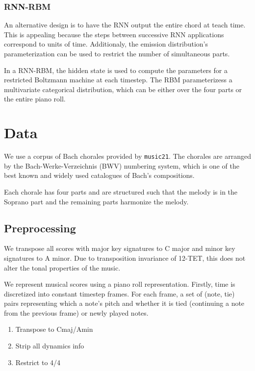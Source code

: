 \documentclass[a4paper,12pt,twoside,openright]{report}
\begin{document}
\subsection{RNN-RBM}
An alternative design is to have the RNN output the entire chord at teach time.
This is appealing because the steps between successive RNN applications
correspond to units of time. Additionaly, the emission distribution's parameterization
can be used to restrict the number of simultaneous parts.

In a RNN-RBM, the hidden state is used to compute the parameters for a restricted Boltzmann
machine at each timestep. The RBM parameterizess a multivariate categorical distribution,
which can be either over the four parts or the entire piano roll.

\chapter{Data}

We use a corpus of Bach chorales provided by \texttt{music21}. The chorales are
arranged by the Bach-Werke-Verzeichnis (BWV) numbering system, which is one of
the best known and widely used catalogues of Bach's compositions.

Each chorale has four parts and are structured such that the melody is in
the Soprano part and the remaining parts harmonize the melody.

\section{Preprocessing}

We transpose all scores with major key signatures to C major and minor key
signatures to A minor. Due to transposition invariance of 12-TET, this does
not alter the tonal properties of the music.

We represent musical scores using a piano roll representation. Firstly, time is
discretized into constant timestep frames. For each frame, a set of (note, tie)
pairs representing which a note's pitch and whether it is tied
(continuing a note from the previous frame) or newly played notes.

\begin{enumerate}
    \item Transpose to Cmaj/Amin
    \item Strip all dynamics info
    \item Restrict to 4/4
\end{enumerate}
\end{document}
